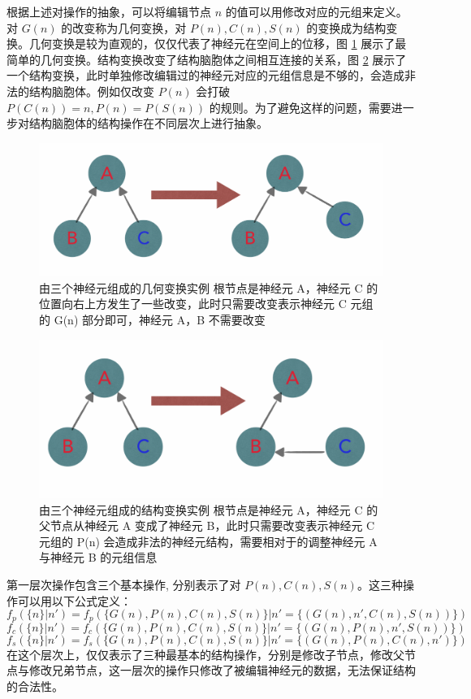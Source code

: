根据上述对操作的抽象，可以将编辑节点 $n$ 的值可以用修改对应的元组来定义。对 $G(n)$ 的改变称为几何变换，对 $P(n), C(n), S(n)$ 的变换成为结构变换。几何变换是较为直观的，仅仅代表了神经元在空间上的位移，图 \ref{gem} 展示了最简单的几何变换。结构变换改变了结构脑胞体之间相互连接的关系，图 \ref{stru} 展示了一个结构变换，此时单独修改编辑过的神经元对应的元组信息是不够的，会造成非法的结构脑胞体。例如仅改变 $P(n)$ 会打破 $P(C(n)) = n, P(n) = P(S(n))$ 的规则。为了避免这样的问题，需要进一步对结构脑胞体的结构操作在不同层次上进行抽象。

\begin{figure}
\centering
\includegraphics[width=148mm]{images/gem}
\caption{由三个神经元组成的几何变换实例 根节点是神经元 A，神经元 C 的位置向右上方发生了一些改变，此时只需要改变表示神经元 C 元组的 G(n) 部分即可，神经元 A，B 不需要改变}
\label{gem}
\end{figure}

\begin{figure}
\centering
\includegraphics[width=148mm]{images/stru}
\caption{由三个神经元组成的结构变换实例 根节点是神经元 A，神经元 C 的
父节点从神经元 A 变成了神经元 B，此时只需要改变表示神经元 C 元组的 P(n) 会造成非法的神经元结构，需要相对于的调整神经元 A 与神经元 B 的元组信息}
\label{stru}
\end{figure}

第一层次操作包含三个基本操作, 分别表示了对 $P(n), C(n), S(n)$。这三种操作可以用以下公式定义：
$$f_p(\{n\}|n') = f_p(\{G(n), P(n), C(n), S(n)\}|n' = \{(G(n), n', C(n), S(n))\})$$
$$f_c(\{n\}|n') = f_c(\{G(n), P(n), C(n), S(n)\}|n' = \{(G(n), P(n), n', S(n))\})$$
$$f_s(\{n\}|n') = f_s(\{G(n), P(n), C(n), S(n)\}|n' = \{(G(n), P(n), C(n), n')\})$$
在这个层次上，仅仅表示了三种最基本的结构操作，分别是修改子节点，修改父节点与修改兄弟节点，这一层次的操作只修改了被编辑神经元的数据，无法保证结构的合法性。

